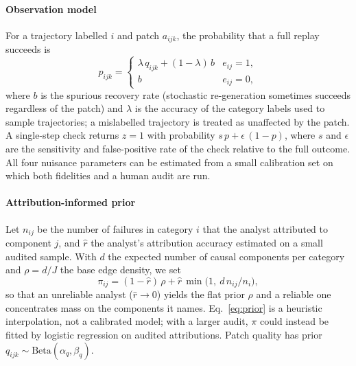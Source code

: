 \documentclass[11pt]{article}
\begin{document}
\paragraph{Observation model}
For a trajectory labelled $i$ and patch $a_{ijk}$, the probability that a full replay succeeds is
\begin{equation}
p_{ijk} = \begin{cases} \lambda\, q_{ijk} + (1-\lambda)\, b & e_{ij}=1,\\ b & e_{ij}=0,\end{cases}
\end{equation}
where $b$ is the spurious recovery rate (stochastic re-generation sometimes succeeds regardless of the patch) and $\lambda$ is the accuracy of the category labels used to sample trajectories; a mislabelled trajectory is treated as unaffected by the patch. A single-step check returns $z=1$ with probability $s\,p+\epsilon\,(1-p)$, where $s$ and $\epsilon$ are the sensitivity and false-positive rate of the check relative to the full outcome. All four nuisance parameters can be estimated from a small calibration set on which both fidelities and a human audit are run.

\paragraph{Attribution-informed prior}
Let $n_{ij}$ be the number of failures in category $i$ that the analyst attributed to component $j$, and $\hat r$ the analyst's attribution accuracy estimated on a small audited sample. With $d$ the expected number of causal components per category and $\rho=d/J$ the base edge density, we set
\begin{equation}
\pi_{ij} = (1-\hat r)\,\rho + \hat r\,\min\!\big(1,\ d\, n_{ij}/n_i\big),
\label{eq:prior}
\end{equation}
so that an unreliable analyst ($\hat r\to0$) yields the flat prior $\rho$ and a reliable one concentrates mass on the components it names. Eq.~\ref{eq:prior} is a heuristic interpolation, not a calibrated model; with a larger audit, $\pi$ could instead be fitted by logistic regression on audited attributions. Patch quality has prior $q_{ijk}\sim\mathrm{Beta}(\alpha_q,\beta_q)$.
\end{document}
